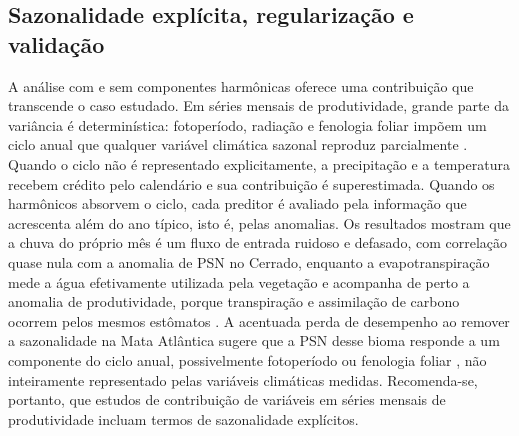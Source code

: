 \documentclass[a4paper,fleqn]{cas-dc}
\begin{document}
\subsection{Sazonalidade explícita, regularização e validação}

A análise com e sem componentes harmônicas oferece uma contribuição que transcende o caso estudado. Em séries mensais de produtividade, grande parte da variância é determinística: fotoperíodo, radiação e fenologia foliar impõem um ciclo anual que qualquer variável climática sazonal reproduz parcialmente \citep{wu2016,alberton2019}. Quando o ciclo não é representado explicitamente, a precipitação e a temperatura recebem crédito pelo calendário e sua contribuição é superestimada. Quando os harmônicos absorvem o ciclo, cada preditor é avaliado pela informação que acrescenta além do ano típico, isto é, pelas anomalias. Os resultados mostram que a chuva do próprio mês é um fluxo de entrada ruidoso e defasado, com correlação quase nula com a anomalia de PSN no Cerrado, enquanto a evapotranspiração mede a água efetivamente utilizada pela vegetação e acompanha de perto a anomalia de produtividade, porque transpiração e assimilação de carbono ocorrem pelos mesmos estômatos \citep{lawson2019}. A acentuada perda de desempenho ao remover a sazonalidade na Mata Atlântica sugere que a PSN desse bioma responde a um componente do ciclo anual, possivelmente fotoperíodo ou fenologia foliar \citep{borchert2001,wu2016}, não inteiramente representado pelas variáveis climáticas medidas. Recomenda-se, portanto, que estudos de contribuição de variáveis em séries mensais de produtividade incluam termos de sazonalidade explícitos.
\end{document}
